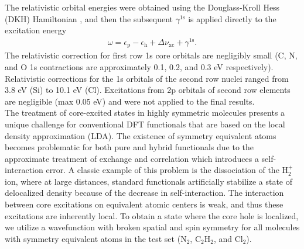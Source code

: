 \documentclass[11.5pt]{article}
\begin{document}
The relativistic orbital energies were obtained using the Douglass-Kroll Hess (DKH) Hamiltonian \cite{douglas_quantum_1973,hess_applicability_1985, hess_relativistic_1986}, and then the subsequent $\gamma^{\text{1s}}$ is applied directly to the excitation energy
\begin{align}
\omega = \epsilon_{\text{p}} - \epsilon_{\text{h}} + \Delta \nu_{\text{xc}} + \gamma^{\text{1s}} .
\end{align}
The relativistic correction for first row 1s core orbitals are negligibly small (C, N, and O 1s contractions are approximately 0.1, 0.2, and 0.3 eV respectively). Relativistic corrections for the 1s orbitals of the second row nuclei ranged from 3.8 eV (Si) to 10.1 eV (Cl). Excitations from 2p orbitals of second row elements are negligible (max 0.05 eV) and were not applied to the final results. \\
The treatment of core-excited states in highly symmetric molecules presents a unique challenge for conventional DFT functionals that are based on the local density approximation (LDA). The existence of symmetry equivalent atoms becomes problematic for both pure and hybrid functionals due to the approximate treatment of exchange and correlation which introduces a self-interaction error.\cite{lundberg_quantifying_2005} A classic example of this problem is the dissociation of the H$_2^+$ ion, where at large distances, standard functionals artificially stabilize a state of delocalized density because of the decrease in self-interaction.\cite{bally_incorrect_1997} The interaction between core excitations on equivalent atomic centers is weak, and thus these excitations are inherently local. To obtain a state where the core hole is localized, we utilize a wavefunction with broken spatial and spin symmetry for all molecules with symmetry equivalent atoms in the test set (N$_2$, C$_2$H$_2$, and Cl$_2$).
\end{document}
